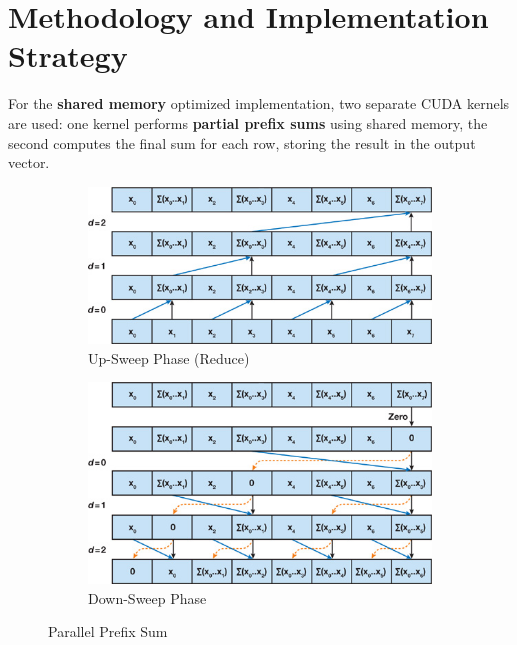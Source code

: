 \documentclass[conference]{IEEEtran}
\begin{document}
    \section{Methodology and Implementation Strategy}\label{sec:methodology}

    For the \textbf{shared memory} optimized implementation, two separate CUDA
    kernels are used: one kernel performs \textbf{partial prefix sums} using
    shared memory, the second computes the final sum for each row, storing the
    result in the output vector.

    \begin{figure}[ht]
        \centering
        \begin{subfigure}{0.24\textwidth}
            \includegraphics[width=\linewidth]{prefix-sum-up-sweep.jpg}
            \caption{Up-Sweep Phase (Reduce)}
            \label{fig:up-sweep}
        \end{subfigure}
        \hfill
        \begin{subfigure}{0.24\textwidth}
            \includegraphics[width=\linewidth]{prefix-sum-down-sweep.jpg}
            \caption{Down-Sweep Phase}
            \label{fig:down-sweep}
        \end{subfigure}
        \caption{Parallel Prefix Sum}
        \label{fig:prefix-sum}
    \end{figure}
\end{document}
